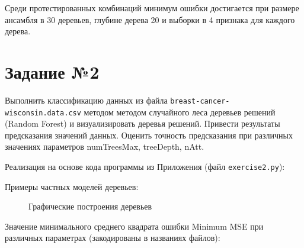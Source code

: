 \documentclass{article} %
\begin{document}
Среди протестированных комбинаций минимум ошибки достигается
при размере ансамбля в 30 деревьев,
глубине дерева 20 и выборки в 4 признака для каждого дерева.

\clearpage
\section{Задание №2}
Выполнить классификацию данных из файла
\verb$breast-cancer-wisconsin.data.csv$ методом
методом случайного леса деревьев решений (Random Forest) и визуализировать деревья
решений. Привести результаты предсказания значений данных. Оценить точность
предсказания при различных значениях параметров numTreesMax, treeDepth, nAtt.
\bigskip

Реализация на основе кода программы из Приложения (файл \verb$exercise2.py$):
\bigskip

\clearpage
Примеры частных моделей деревьев:
\begin{figure}[H]
	\centering
	\hfill
    \caption{Графические построения деревьев}
\end{figure}
\bigskip

Значение минимального среднего квадрата ошибки Minimum MSE
при различных параметрах (закодированы в названиях файлов):

\end{document}
